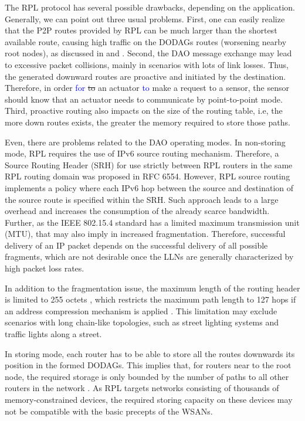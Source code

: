 \documentclass[authoryear,preprint,review,12pt]{elsarticle}
\newcommand{\rev}{\textcolor{blue}}
\begin{document}
The RPL protocol has several possible drawbacks, depending on the application. Generally, we can point out three usual problems. First, one can easily realize that the P2P routes provided by RPL can be much larger than the shortest available route, causing high traffic on the DODAGs routes (worsening nearby root nodes), as discussed in \citep{P2P_analysis_2010} and \citep{P2P-RPL_2011}. Second, the DAO message exchange may lead to excessive packet collisions, mainly in scenarios with lots of link losses. Thus, the generated downward routes are proactive and initiated by the destination. Therefore, in order \rev{for} \sout{to} an actuator \rev{to} make a request to a sensor, the sensor should know that an actuator needs to communicate by point-to-point mode. Third, proactive routing also impacts on the size of the routing table, i.e, the more down routes exists, the greater the memory required to store those paths.

Even, there are problems related to the DAO operating modes. In non-storing mode, RPL requires the use of IPv6 source routing mechanism. Therefore, a Source Routing Header (SRH) for use strictly between RPL routers in the same RPL routing domain was proposed in RFC 6554. However, RPL source routing implements a policy where each IPv6 hop between the source and destination of the source route is specified within the SRH. Such approach leads to a large overhead and increases the consumption of the already scarce bandwidth. Further, as the IEEE 802.15.4 standard has a limited maximum transmission unit (MTU), that may also imply in increased fragmentation. Therefore, successful delivery of an IP packet depends on the successful delivery of all possible fragments, which are not desirable once the LLNs are generally characterized by high packet loss rates.

In addition to the fragmentation issue, the maximum length of the routing header is limited to 255 octets \citep{RFC4944}, which restricts the maximum path length to 127 hops if an address compression mechanism is applied \citep{herberg}. This limitation may exclude scenarios with long chain-like topologies, such as street lighting systems and traffic lights along a street.

In storing mode, each router has to be able to store all the routes downwards its position in the formed DODAGs. This implies that, for routers near to the root node, the required storage is only bounded by the number of paths to all other routers in the network \citep{RPL_observations}. As RPL targets networks consisting of thousands of memory-constrained devices, the required storing capacity on these devices may not be compatible with the basic precepts of the WSANs.
\end{document}
